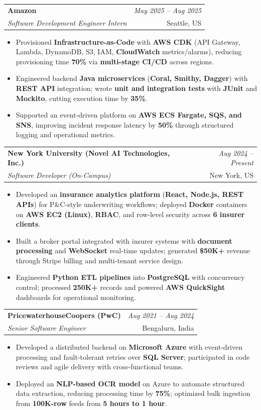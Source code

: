 \documentclass[a4paper,10pt]{article}
\makeatletter
\newcommand{\resumeSubheading}[4]{
\vspace{0.3mm}\item
    \begin{tabular*}{0.98\textwidth}[t]{l@{\extracolsep{\fill}}r}
        \textbf{#1} & \textit{\footnotesize{#4}} \\
        \textit{\footnotesize{#3}} & \footnotesize{#2}\\
    \end{tabular*}\vspace{-2mm}
}
\newcommand{\resumeItemListStart}{\begin{itemize}[leftmargin=*, labelsep=1mm, itemsep=0pt]}
\newcommand{\resumeItemListEnd}{\end{itemize}\vspace{-2mm}}
\makeatother
\begin{document}
\resumeSubheading
{Amazon}{Seattle, US}
{Software Development Engineer Intern}{May 2025 -- Aug 2025}
\resumeItemListStart
\item \footnotesize{Provisioned \textbf{Infrastructure-as-Code} with \textbf{AWS CDK} (API Gateway, Lambda, DynamoDB, S3, IAM, \textbf{CloudWatch} metrics/alarms), reducing provisioning time \textbf{70\%} via \textbf{multi-stage CI/CD} across regions.}
\item \footnotesize{Engineered backend \textbf{Java microservices} (\textbf{Coral, Smithy, Dagger}) with \textbf{REST API} integration; wrote \textbf{unit and integration tests} with \textbf{JUnit} and \textbf{Mockito}, cutting execution time by \textbf{35\%}.}
\item \footnotesize{Supported an event-driven platform on \textbf{AWS ECS Fargate, SQS, and SNS}, improving incident response latency by \textbf{50\%} through structured logging and operational metrics.}
\resumeItemListEnd

\resumeSubheading
{New York University (Novel AI Technologies, Inc.)}{New York, US}
{Software Developer (On-Campus)}{Aug 2024 -- Present}
\resumeItemListStart
\item \footnotesize{Developed an \textbf{insurance analytics platform} (\textbf{React, Node.js, REST APIs}) for P\&C-style underwriting workflows; deployed \textbf{Docker} containers on \textbf{AWS EC2 (Linux)}, \textbf{RBAC}, and row-level security across \textbf{6 insurer clients}.}
\item \footnotesize{Built a broker portal integrated with insurer systems with \textbf{document processing} and \textbf{WebSocket} real-time updates; generated \textbf{\$50K+} revenue through Stripe billing and multi-tenant service design.}
\item \footnotesize{Engineered \textbf{Python ETL pipelines} into \textbf{PostgreSQL} with concurrency control; processed \textbf{250K+} records and powered \textbf{AWS QuickSight} dashboards for operational monitoring.}
\resumeItemListEnd

\resumeSubheading
{PricewaterhouseCoopers (PwC)}{Bengaluru, India}
{Senior Software Engineer}{Aug 2021 -- Aug 2024}
\resumeItemListStart
\item \footnotesize{Developed a distributed backend on \textbf{Microsoft Azure} with event-driven processing and fault-tolerant retries over \textbf{SQL Server}; participated in code reviews and agile delivery with cross-functional teams.}
\item \footnotesize{Deployed an \textbf{NLP-based OCR model} on Azure to automate structured data extraction, reducing processing time by \textbf{75\%}; optimized bulk ingestion from \textbf{100K-row} feeds from \textbf{5 hours to 1 hour}.}
\resumeItemListEnd
\end{document}
